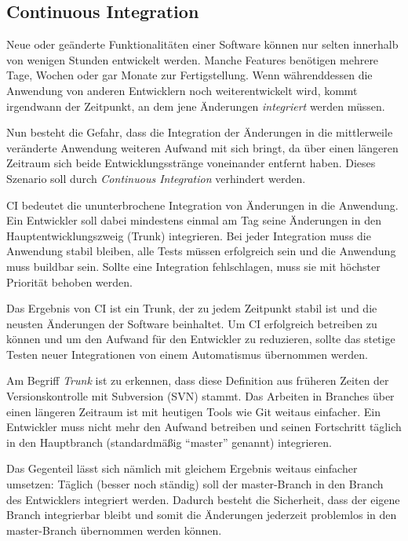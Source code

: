 \subsection{Continuous Integration}

Neue oder geänderte Funktionalitäten einer Software können nur selten innerhalb von wenigen Stunden entwickelt werden. Manche Features benötigen mehrere Tage, Wochen oder gar Monate zur Fertigstellung. Wenn während\-dessen die Anwendung von anderen Entwicklern noch weiterentwickelt wird, kommt irgendwann der Zeitpunkt, an dem jene Änderungen \emph{integriert} werden müssen.

Nun besteht die Gefahr, dass die Integration der Änderungen in die mittlerweile veränderte Anwendung weiteren Aufwand mit sich bringt, da über einen längeren Zeitraum sich beide Entwicklungsstränge voneinander entfernt haben. Dieses Szenario soll durch \emph{Continuous Integration} verhindert werden.

\ac{CI} bedeutet die ununterbrochene Integration von Än\-der\-ung\-en in die Anwendung. Ein Entwickler soll dabei mindestens einmal am Tag seine Änderungen in den Hauptentwicklungszweig (Trunk) integrieren. Bei jeder Integration muss die Anwendung stabil bleiben, alle Tests müssen erfolgreich sein und die Anwendung muss buildbar sein. Sollte eine Integration fehlschlagen, muss sie mit höchster Priorität behoben werden. \citep[25ff]{Duvall2007}

Das Ergebnis von \ac{CI} ist ein Trunk, der zu jedem Zeitpunkt stabil ist und die neusten Änderungen der Software beinhaltet. Um \ac{CI} erfolgreich betreiben zu können und um den Aufwand für den Entwickler zu reduzieren, sollte das stetige Testen neuer Integrationen von einem Automatismus übernommen werden.

Am Begriff \emph{Trunk} ist zu erkennen, dass diese Definition aus früheren Zeiten der Versionskontrolle mit Subversion (SVN) stammt. Das Arbeiten in Branches über einen längeren Zeitraum ist mit heutigen Tools wie Git weitaus einfacher. Ein Entwickler muss nicht mehr den Aufwand betreiben und seinen Fortschritt täglich in den Hauptbranch (standardmäßig ``master'' genannt) integrieren.

Das Gegenteil lässt sich nämlich mit gleichem Ergebnis weitaus einfacher umsetzen: Täglich (besser noch ständig) soll der master-Branch in den Branch des Entwicklers integriert werden. Dadurch besteht die Sicherheit, dass der eigene Branch integrierbar bleibt und somit die Änderungen jederzeit problemlos in den master-Branch übernommen werden können.

